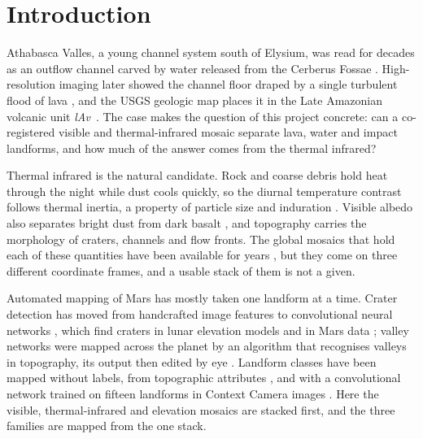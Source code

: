 \documentclass[twocolumn]{aastex701}
\newcommand{\lAv}{\textit{lAv}}
\begin{document}
\section{Introduction} \label{sec:intro}

Athabasca Valles, a young channel system south of Elysium, was read for decades as an outflow channel carved by
water released from the Cerberus Fossae \citep{Burr2002, Plescia2003}. High-resolution imaging later showed the
channel floor draped by a single turbulent flood of lava \citep{Jaeger2007, Jaeger2010}, and the USGS geologic map
places it in the Late Amazonian volcanic unit \lAv\ \citep{Tanaka2014}. The case makes the question of this project
concrete: can a co-registered visible and thermal-infrared mosaic separate lava, water and impact landforms, and how
much of the answer comes from the thermal infrared? %

Thermal infrared is the natural candidate. Rock and coarse debris hold heat through the night while dust cools
quickly, so the diurnal temperature contrast follows thermal inertia, a property of particle size and induration
\citep{Mellon2000, Fergason2006, Putzig2007}. Visible albedo also separates bright dust from dark basalt
\citep{Ruff2002}, and topography carries the morphology of craters, channels and flow fronts. The global mosaics that
hold each of these quantities have been available for years \citep{Archinal2003, Edwards2011, Fergason2018}, but
they come on three different coordinate frames, and a usable stack of them is not a given.

Automated mapping of Mars has mostly taken one landform at a time. Crater detection has moved from handcrafted
image features to convolutional neural networks \citep{DeLatte2019}, which find craters in lunar elevation models
\citep{Silburt2019} and in Mars data \citep{Lee2019}; valley networks were mapped across the planet by an algorithm
that recognises valleys in topography, its output then edited by eye \citep{Luo2009}. Landform classes have been
mapped without labels, from topographic attributes \citep{Bue2006}, and with a convolutional network trained on
fifteen landforms in Context Camera images \citep{Wilhelm2020}. Here the visible, thermal-infrared and elevation
mosaics are stacked first, and the three families are mapped from the one stack. %
\end{document}
